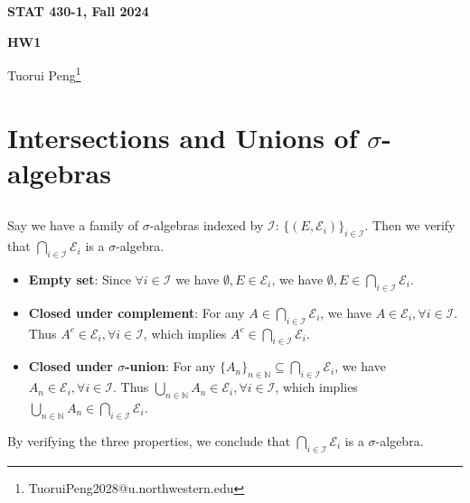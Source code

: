 \documentclass[11pt,a4paper]{article}
\numberwithin{equation}{section}%
\begin{document}
\begin{center}\thispagestyle{plain}

{\LARGE\textbf{STAT 430-1, Fall 2024}}

{\Large\textbf{HW1}}

Tuorui Peng\footnote{TuoruiPeng2028@u.northwestern.edu}
\end{center}

\thispagestyle{myheadings}
\pagestyle{myheadings}

\setcounter{tocdepth}{1}
\tableofcontents


  


\section{Intersections and Unions of $ \sigma  $-algebras}

\subsection{}
Say we have a family of $ \sigma $-algebras indexed by $ \mathcal{I} $: $ \{(E,\mathcal{E}_i)\}_{i\in \mathcal{I}} $. Then we verify that $ \bigcap_{i\in \mathcal{I}} \mathcal{E}_i $ is a $ \sigma $-algebra.

\begin{itemize}[topsep=2pt,itemsep=0pt]
    \item \textbf{Empty set}: Since $ \forall i\in \mathcal{I} $ we have $ \emptyset, E \in \mathcal{E}_i $, we have $ \emptyset, E\in \bigcap_{i\in \mathcal{I}} \mathcal{E}_i $.
    \item \textbf{Closed under complement}: For any $ A\in \bigcap_{i\in \mathcal{I}} \mathcal{E}_i $, we have $ A\in \mathcal{E}_i, \forall i\in \mathcal{I} $. Thus $ A^c\in \mathcal{E}_i, \forall i\in \mathcal{I} $, which implies $ A^c\in \bigcap_{i\in \mathcal{I}} \mathcal{E}_i $.
    \item \textbf{Closed under $ \sigma  $-union}: For any $ \{A_n\}_{n\in \mathbb{N}}\subseteq \bigcap_{i\in \mathcal{I}} \mathcal{E}_i $, we have $ A_n\in \mathcal{E}_i, \forall i\in \mathcal{I} $. Thus $ \bigcup_{n\in \mathbb{N}} A_n\in \mathcal{E}_i, \forall i\in \mathcal{I} $, which implies $ \bigcup_{n\in \mathbb{N}} A_n\in \bigcap_{i\in \mathcal{I}} \mathcal{E}_i $.
\end{itemize}
By verifying the three properties, we conclude that $ \bigcap_{i\in \mathcal{I}} \mathcal{E}_i $ is a $ \sigma $-algebra.
\end{document}
